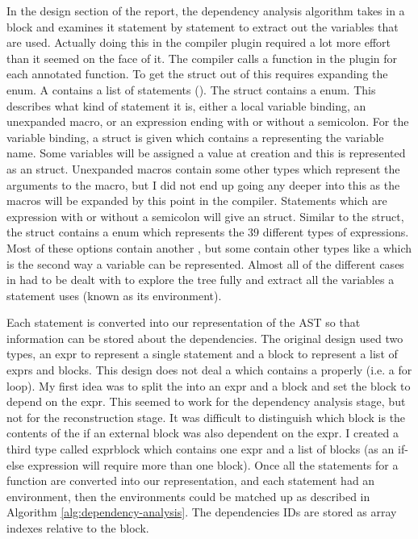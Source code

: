 
In the design section of the report, the dependency analysis algorithm takes in a block and examines it statement by statement to extract out the variables that are used. Actually doing this in the compiler plugin required a lot more effort than it seemed on the face of it. The compiler calls a function in the plugin for each annotated function. To get the  struct out of this requires expanding the  enum. A  contains a list of statements (). The  struct contains a  enum. This describes what kind of statement it is, either a local variable binding, an unexpanded macro, or an expression ending with or without a semicolon. For the variable binding, a  struct is given which contains a  representing the variable name. Some variables will be assigned a value at creation and this is represented as an  struct. Unexpanded macros contain some other types which represent the arguments to the macro, but I did not end up going any deeper into this as the macros will be expanded by this point in the compiler. Statements which are expression with or without a semicolon will give an  struct. Similar to the  struct, the  struct contains a  enum which represents the $39$ different types of expressions. Most of these options contain another , but some contain other types like a  which is the second way a variable can be represented. Almost all of the different cases in  had to be dealt with to explore the tree fully and extract all the variables a statement uses (known as its environment).

Each statement is converted into our representation of the AST so that information can be stored about the dependencies. The original design used two types, an expr to represent a single statement and a block to represent a list of exprs and blocks. This design does not deal a  which contains a  properly (i.e. a for loop). My first idea was to split the  into an expr and a block and set the block to depend on the expr. This seemed to work for the dependency analysis stage, but not for the reconstruction stage. It was difficult to distinguish which block is the contents of the  if an external block was also dependent on the expr. I created a third type called exprblock which contains one expr and a list of blocks (as an if-else expression will require more than one block). Once all the statements for a function are converted into our representation, and each statement had an environment, then the environments could be matched up as described in Algorithm \ref{alg:dependency-analysis}. The dependencies IDs are stored as array indexes relative to the block.

